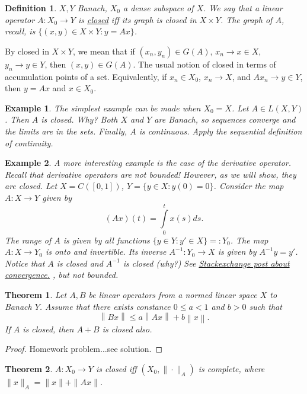 \documentclass[letterpaper,twoside,11pt]{article}
\theoremstyle{mystyle}
\newtheorem*{thm}{Theorem}		%
\newtheorem{definition}{Definition}[section]
\newtheorem*{ex}{Example}
\newcommand{\cg}{\color{gray}}
\newcommand{\cbk}{\color{black}}
\newcommand{\cred}{\color{red}}
\begin{document}
\begin{definition}
  $X,Y$ Banach, $X_0$ a dense subspace of $X$. We say that a linear operator $A:X_0 \to Y$ is \underline{closed} iff its graph is closed in $X\times Y$. \cg The graph of $A$, recall, is $\{(x, y) \in X\times Y : y = Ax\}$. \cbk 
\end{definition}
By closed in $X\times Y$, we mean that if $(x_n, y_n)\in G(A)$, $x_n \to x\in X$, $y_n \to y \in Y$, then $(x,y)\in G(A)$. \cg The usual notion of closed in terms of accumulation points of a set. Equivalently, if $x_n\in X_0$, $x_n \to X$, and $Ax_n\to y\in Y$, then $y = Ax$ and $x\in X_0$. \cbk
\begin{ex}
  The simplest example can be made when $X_0 = X$. Let $A \in L(X,Y)$. Then $A$ is closed. \cg Why? Both $X$ and $Y$ are Banach, so sequences converge and the limits are in the sets. Finally, $A$ is continuous. Apply the sequential definition of continuity. \cbk 
\end{ex}
\begin{ex}
  A more interesting example is the case of the derivative operator. Recall that derivative operators are not bounded! However, as we will show, they are closed. Let $X = C([0,1])$, $Y=\{y\in X : y(0) =0\}$. Consider the map $A: X \to Y$ given by 
  \[(Ax)(t) = \int \limits_0^t x(s) ds.\]
  The range of $A$ is given by all functions $\{y\in Y : y'\in X\}=:Y_0$. The map $A: X \to Y_0$ is onto and invertible. Its inverse $A^{-1}: Y_0 \to X$ is given by $A^{-1} y = y'$. Notice that $A$ is closed and $A^{-1}$ is closed \cred (why?) See \href{https://math.stackexchange.com/questions/214218/uniform-convergence-of-derivatives-tao-14-2-7}{Stackexchange post about convergence.} \cbk, but not bounded.  

\end{ex}
\begin{tcolorbox}[colback=red!5!white,colframe=red!75!black]
\begin{thm}
  Let $A,B$ be linear operators from a normed linear space $X$ to Banach $Y$. Assume that there exists constance $0\leq a < 1$ and $b>0$ such that 
  \[\left\| {Bx} \right\| \leq a\left\| {Ax} \right\| + b\left\| x \right\|.\]
  If $A$ is closed, then $A+B$ is closed also. 
\end{thm}
\end{tcolorbox}
\begin{proof}
  Homework problem...see solution.
\end{proof}
\begin{tcolorbox}[colback=red!5!white,colframe=red!75!black]
  \begin{thm}
    $A:X_0 \to Y$ is closed iff $(X_0, \|\cdot\|_A)$ is complete, where $\|x\|_A = \|x\| + \|Ax\|$. 
  \end{thm}
\end{tcolorbox}
\end{document}

